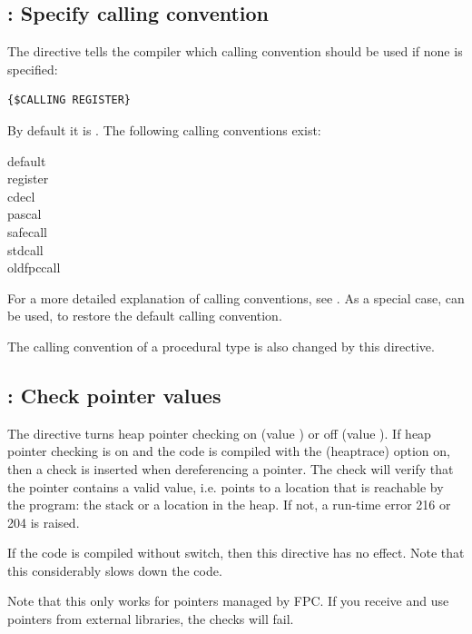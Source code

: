 \subsection{ : Specify calling convention}
\label{se:dircalling}
The  directive tells the compiler which calling 
convention should be used if none is specified:
\begin{verbatim}
{$CALLING REGISTER}
\end{verbatim}
 By default it is . The following calling conventions exist:
\begin{description}
\item[default]
\item[register]
\item[cdecl]
\item[pascal]
\item[safecall]
\item[stdcall]
\item[oldfpccall]
\end{description}
For a more detailed explanation of calling conventions, see .
As a special case,  can be used, to restore the default calling
convention.

\begin{remark}
The calling convention of a procedural type is also changed by this directive.
\end{remark}

\subsection{ : Check pointer values}
The  directive turns heap pointer checking on (value
) or off (value ). If heap pointer checking is on and the
code is compiled with the  (heaptrace) option on, then a check is
inserted when dereferencing a pointer. The check will verify that the
pointer contains a valid value, i.e. points to a location that is reachable
by the program: the stack or a location in the heap. If not, a run-time error
216 or 204 is raised.

If the code is compiled without  switch, then this directive has no
effect. Note that this considerably slows down the code.

Note that this only works for pointers managed by FPC. If you receive
and use pointers from external libraries, the checks will fail.

